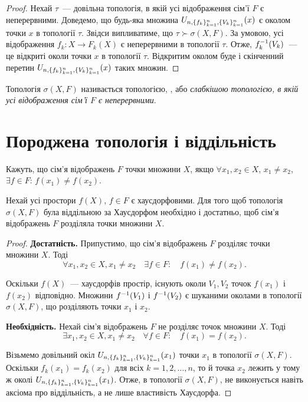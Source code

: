 \begin{proof}
    Нехай $\tau$~--- довільна топологія, в якій усі відображення сім'ї $F$ є неперервними. Доведемо, що будь-яка множина $U_{n,\{f_k\}_{k=1}^n,\{V_k\}_{k=1}^n}(x)$ є околом точки $x$ в топології $\tau$. Звідси випливатиме, що $\tau \succ \sigma(X, F)$. За умовою, усі відображення $f_k: X \to F_k(X)$ є неперервними в топології $\tau$. Отже, $f_k^{-1}(V_k)$~--- це відкриті околи точки $x$ в топології $\tau$. Відкритим околом буде і скінченний перетин $U_{n,\{f_k\}_{k=1}^n,\{V_k\}_{k=1}^n}(x)$ таких множин.
\end{proof}

\begin{definition}
    Топологія $\sigma(X, F)$ називається топологією, , або \emph{слабкішою топологією, в якій усі відображення сім'ї $F$ є неперервними}.
\end{definition}

\section{Породжена топологія і віддільність}

\begin{definition}
    Кажуть, що сім'я відображень $F$  точки множини $X$, якщо $\forall x_1, x_2 \in X$, $x_1 \ne x_2$, $\exists f \in F$: $f(x_1) \ne f(x_2)$.
\end{definition}

\begin{theorem}
    \label{th:induced-topology-hausdorff-separability-criterion}
    Нехай усі простори $f(X)$, $f \in F$ є хаусдорфовими. Для того щоб топологія $\sigma(X, F)$ була віддільною за Хаусдорфом необхідно і достатньо, щоб сім'я відображень $F$ розділяла точки множини $X$.
\end{theorem}

\begin{proof}
    \textbf{Достатність.} Припустимо, що сім'я відображень $F$ розділяє точки множини $X$. Тоді
    \begin{equation*}
        \forall x_1, x_2 \in X, x_1 \ne x_2 \quad \exists f \in F: \quad f(x_1) \ne f(x_2).
    \end{equation*}

    Оскільки $f(X)$~--- хаусдорфів простір, існують околи $V_1, V_2$ точок $f(x_1)$ і $f(x_2)$ відповідно. Множини $f^{-1}(V_1)$ і $f^{-1}(V_2)$ є шуканими околами в топології $\sigma(X, F)$, що розділяють точки $x_1$ і $x_2$.

    \textbf{Необхідність.} Нехай сім'я відображень $F$ не розділяє точок множини $X$. Тоді
    \begin{equation*}
        \exists x_1, x_2 \in X, x_1 \ne x_2 \quad \forall f \in F: \quad f(x_1) = f(x_2).
    \end{equation*}

    Візьмемо довільний окіл $U_{n,\{f_k\}_{k=1}^n,\{V_k\}_{k=1}^n}(x_1)$ точки $x_1$ в топології $\sigma(X, F)$. Оскільки $f_k(x_1) = f_k(x_2)$ для всіх $k = 1, 2, \dots, n$, то й точка $x_2$ лежить у тому ж околі $U_{n,\{f_k\}_{k=1}^n,\{V_k\}_{k=1}^n}(x_1)$. Отже, в топології $\sigma(X, F)$, не виконується навіть аксіома про віддільність, а не лише властивість Хаусдорфа.
\end{proof}


